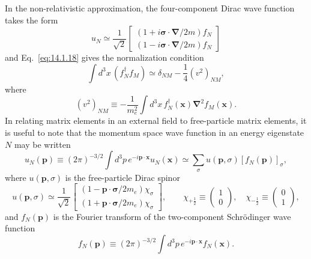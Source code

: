 In the non-relativistic approximation, the four-component Dirac wave function
takes the form
\begin{equation}
  u_N\simeq\frac1{\sqrt2}
  \begin{bmatrix}(1+i\boldsymbol\sigma\cdot\boldsymbol\nabla/2m)f_N\\
  (1-i\boldsymbol\sigma\cdot\boldsymbol\nabla/2m)f_N\end{bmatrix}
  \tag{14.1.37}\label{eq:14.1.37}
\end{equation}
and Eq.~\eqref{eq:14.1.18} gives the normalization condition
\begin{equation}
  \int d^3x\,(f_N^\dagger f_M)\simeq\delta_{NM}-\frac14(v^2)_{NM},
  \tag{14.1.38}\label{eq:14.1.38}
\end{equation}
where
\[
  (v^2)_{NM}\equiv-\frac1{m_e^2}\int d^3x\,
  f_N^\dagger(\mathbf x)\boldsymbol\nabla^2f_M(\mathbf x).
\]
In relating matrix elements in an external field to free-particle matrix
elements, it is useful to note that the momentum space wave function in an
energy eigenstate $N$ may be written
\begin{equation}
  u_N(\mathbf p)\equiv(2\pi)^{-3/2}\int d^3p\,
  e^{-i\mathbf p\cdot\mathbf x}u_N(\mathbf x)
  \simeq\sum_\sigma u(\mathbf p,\sigma)[f_N(\mathbf p)]_\sigma,
  \tag{14.1.39}\label{eq:14.1.39}
\end{equation}
where $u(\mathbf p,\sigma)$ is the free-particle Dirac spinor
\[
 u(\mathbf p,\sigma)\simeq\frac1{\sqrt2}
 \begin{bmatrix}(1-\mathbf p\cdot\boldsymbol\sigma/2m_e)\chi_\sigma\\
 (1+\mathbf p\cdot\boldsymbol\sigma/2m_e)\chi_\sigma\end{bmatrix},
 \qquad
 \chi_{+\frac12}\equiv\begin{pmatrix}1\\0\end{pmatrix},\quad
 \chi_{-\frac12}\equiv\begin{pmatrix}0\\1\end{pmatrix},
\]
and $f_N(\mathbf p)$ is the Fourier transform of the two-component
Schr\"odinger wave function
\[
  f_N(\mathbf p)\equiv(2\pi)^{-3/2}\int d^3p\,
  e^{-i\mathbf p\cdot\mathbf x}f_N(\mathbf x).
\]

